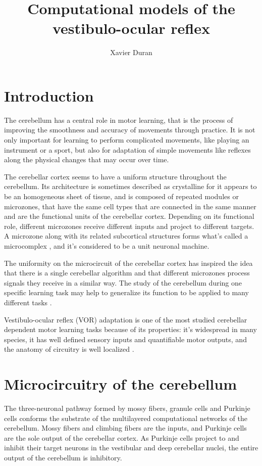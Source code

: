\documentclass[doc,apacite,a4paper]{apa6}
\title{Computational models of the vestibulo-ocular reflex}
\author{Xavier Duran}
\affiliation{Master in Cognitive Systems and Interactive Media}
\begin{document}
\maketitle

\section{Introduction}

The cerebellum has a central role in motor learning, that is the process of improving the smoothness and accuracy of movements through practice. It is not only important for learning to perform complicated movements, like playing an instrument or a sport, but also for adaptation of simple movements like reflexes along the physical changes that may occur over time.

The cerebellar cortex seems to have a uniform structure throughout the cerebellum. Its architecture is sometimes described as crystalline for it appears to be an homogeneous sheet of tissue, and is composed of repeated modules or microzones, that have the same cell types that are connected in the same manner and are the functional units of the cerebellar cortex. Depending on its functional role, different microzones receive different inputs and project to different targets. A microzone along with its related subcortical structures forms what's called a microcomplex \cite{Ito1982}, and it's considered to be a unit neuronal machine.

The uniformity on the microcircuit of the cerebellar cortex has inspired the idea that there is a single cerebellar algorithm and that different microzones process signals they receive in a similar way. The study of the cerebellum during one specific learning task may help to generalize its function to be applied to many different tasks \cite{Boyden2004}.

Vestibulo-ocular reflex (VOR) adaptation is one of the most studied cerebellar dependent motor learning tasks because of its properties: it's widespread in many species, it has well defined sensory inputs and quantifiable motor outputs, and the anatomy of circuitry is well localized \cite{Ito1982}.

\section{Microcircuitry of the cerebellum}

The three-neuronal pathway formed by mossy fibers, granule cells and Purkinje cells conforms the substrate of the multilayered computational networks of the cerebellum. Mossy fibers and climbing fibers are the inputs, and Purkinje cells are the sole output of the cerebellar cortex. As Purkinje cells project to and inhibit their target neurons in the vestibular and deep cerebellar nuclei, the entire output of the cerebellum is inhibitory.
\end{document}
